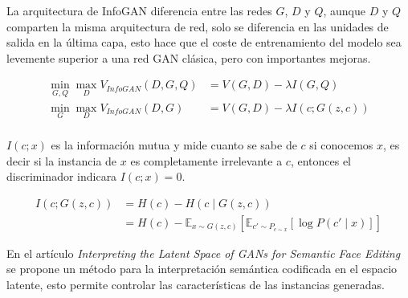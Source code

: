 La arquitectura de \gls{InfoGAN} diferencia entre las redes ${G}$, ${D}$ y ${Q}$, aunque ${D}$ y ${Q}$ comparten la misma arquitectura de red, solo se diferencia en las unidades de salida en la última capa, esto hace que el coste de entrenamiento del modelo sea levemente superior a una red \gls{GAN} clásica, pero con importantes mejoras.

    {\small
        \begin{equation}
            \begin{split}
                \min_{G,Q}\max_{D} V_{InfoGAN}(D,G,Q)   &= V(G,D) - \lambda I(G,Q)      \\
                \min_{G}\max_{D} V_{InfoGAN}(D,G)       &= V(G,D) - \lambda I(c;G(z,c)) \\
            \end{split}
            \label{eq:InfoGAN}
        \end{equation}
    }

${I(c;x)}$ es la información mutua y mide cuanto se sabe de ${c}$ si conocemos ${x}$, es decir si la instancia de $x$ es completamente irrelevante a ${c}$, entonces el discriminador indicara ${I(c;x) = 0}$.

    {\small
        \begin{equation}
            \begin{split}
                I(c; G(z,c))    &=  H(c) - H(c \mid G(z,c))     \\
                &=  H(c) - \mathbb{E}_{x\sim{}G(z,c)}\left[\mathbb{E}_{c'\sim{}P_{c\sim{}x}} \left[ \log{P(c'\mid{}x)}\right]\right]
            \end{split}
        \end{equation}
    }

En el artículo \textit{Interpreting the Latent Space of GANs for Semantic Face Editing} \cite{GANLatentSpace-shen2020interpreting} se propone un método para la interpretación semántica codificada en el espacio latente, esto permite controlar las características de las instancias generadas.






